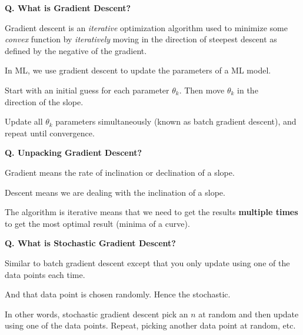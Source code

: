\begin{frame}[fragile]{\textbf{Q. What is Gradient Descent?}}
  \begin{wideitemize}
    \item Gradient descent is an \textit{iterative} optimization algorithm used to minimize
    some \textit{convex} function by \textit{iteratively} moving in the direction of
    steepest descent as defined by the negative of the gradient.
    \item In ML, we use gradient descent to update the parameters of a ML model.\medskip
    \begin{wideitemize}
      \item Start with an initial guess for each parameter $\theta_{k}$. Then
      move $\theta_{k}$ in the \\direction of the slope.
      \item Update all $\theta_{k}$ parameters simultaneously (known as batch gradient descent),
      and \\repeat until convergence.
    \end{wideitemize}
  \end{wideitemize}
\end{frame}

\begin{frame}[fragile]{\textbf{Q. Unpacking Gradient Descent?}}
  \begin{wideitemize}
    \item Gradient means the rate of inclination or declination of a slope.
    \item Descent means we are dealing with the inclination of a slope.
    \item The algorithm is iterative means that we need to get the results
    \textbf{multiple times} to get the most optimal result (minima of a curve).
  \end{wideitemize}
\end{frame}

\begin{frame}[fragile]{\textbf{Q. What is Stochastic Gradient Descent?}}
  \begin{wideitemize}
    \item Similar to batch gradient descent except that you only update
    using one of the data points each time.
    \item And that data point is chosen randomly. Hence the stochastic.
    \item In other words, stochastic gradient descent pick an $n$ at random
    and then update using one of the data points. Repeat, picking another
    data point at random, etc.
  \end{wideitemize}
\end{frame}

